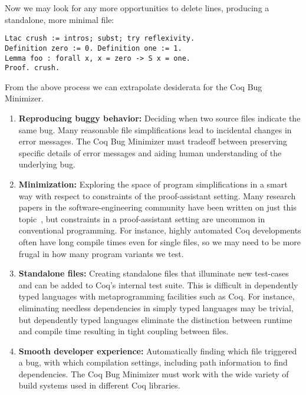 \documentclass[a4paper,USenglish,cleveref,autoref,thm-restate]{lipics-v2021}
\begin{document}
Now we may look for any more opportunities to delete lines, producing a standalone, more minimal file:
\begin{verbatim}
Ltac crush := intros; subst; try reflexivity.
Definition zero := 0. Definition one := 1.
Lemma foo : forall x, x = zero -> S x = one.
Proof. crush.
\end{verbatim}

From the above process we can extrapolate desiderata for the Coq Bug Minimizer.

\begin{enumerate}
\item \textbf{Reproducing buggy behavior:} Deciding when two source files indicate the same bug.
Many reasonable file simplifications lead to incidental changes in error messages.
The Coq Bug Minimizer must tradeoff between preserving specific details of error messages and aiding human understanding of the underlying bug.

\item \textbf{Minimization:} Exploring the space of program simplifications in a smart way with respect to constraints of the proof-assistant setting.
Many research papers in the software-engineering community have been written on just this topic~\cite{Cleve2000,zeller2009programs,Burger2005,delta,Zeller2002}, but constraints in a proof-assistant setting are uncommon in conventional programming.
For instance, highly automated Coq developments often have long compile times even for single files, so we may need to be more frugal in how many program variants we test.

\item \textbf{Standalone files:} Creating standalone files that illuminate new test-cases and can be added to Coq's internal test suite.
This is difficult in dependently typed languages with metaprogramming facilities such as Coq.
For instance, eliminating needless dependencies in simply typed languages may be trivial, but dependently typed languages eliminate the distinction between runtime and compile time resulting in tight coupling between files.

\item \textbf{Smooth developer experience:} Automatically finding which file triggered a bug, with which compilation settings, including path information to find dependencies.
The Coq Bug Minimizer must work with the wide variety of build systems used in different Coq libraries.


\end{enumerate}
\end{document}

